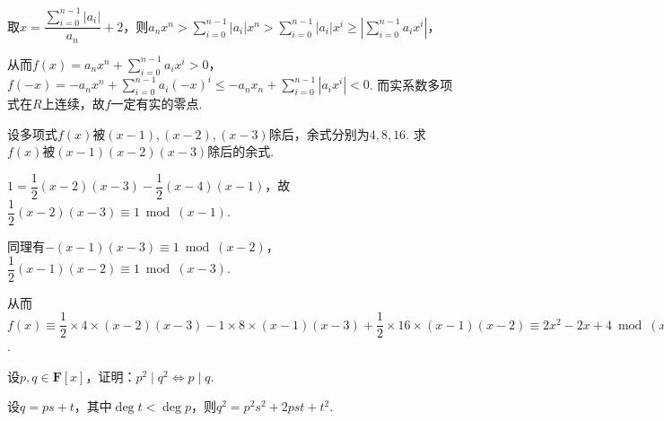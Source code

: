 \begin{exercise}
\begin{exgroup}
\begin{answer}
            取$x=\dfrac{\sum\limits_{i=0}^{n-1}|a_i|}{a_n}+2$，则$a_nx^n>\displaystyle\sum_{i=0}^{n-1}|a_i|x^n>\displaystyle\sum_{i=0}^{n-1}|a_i|x^i\geqslant |\displaystyle\sum_{i=0}^{n-1}a_ix^i|$，

            从而$f(x)=a_nx^n+\displaystyle\sum_{i=0}^{n-1}a_ix^i>0$，$f(-x)=-a_nx^n+\displaystyle\sum_{i=0}^{n-1}a_i(-x)^i\leqslant -a_nx_n+\displaystyle\sum_{i=0}^{n-1}|a_ix^i|<0$.
            而实系数多项式在$R$上连续，故$f$一定有实的零点.
        \end{answer}

    \end{exgroup}

    \begin{exgroup}
        \item 设多项式$f(x)$被$(x-1),(x-2),(x-3)$除后，余式分别为$4,8,16$. 求$f(x)$被$(x-1)(x-2)(x-3)$除后的余式.
        \begin{answer}
            $1=\dfrac{1}{2}(x-2)(x-3)-\dfrac{1}{2}(x-4)(x-1)$，故$\dfrac{1}{2}(x-2)(x-3) \equiv1\bmod{(x-1)}$.

            同理有$-(x-1)(x-3)\equiv1\bmod{(x-2)}$，$\dfrac{1}{2}(x-1)(x-2)\equiv1\bmod{(x-3)}$.

            从而$f(x)\equiv\dfrac{1}{2}\times 4 \times(x-2)(x-3)-1\times 8\times(x-1)(x-3)+\dfrac{1}{2}\times 16\times(x-1)(x-2)\equiv 2x^2-2x+4\bmod{(x-1)(x-2)(x-3)}$.
        \end{answer}
        \item 设$p,q\in\mathbf{F}[x]$，证明：$p^2 \mid q^2\iff p \mid q$.
        \begin{answer}
            设$q=ps+t$，其中$\deg t<\deg p$，则$q^2=p^2s^2+2pst+t^2$.


\end{answer}
\end{exgroup}
\end{exercise}
